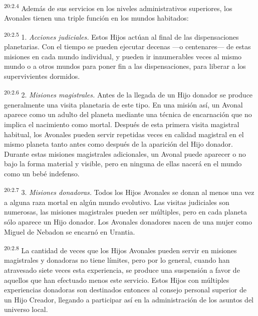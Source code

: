 \par
\textsuperscript{20:2.4} Además de sus servicios en los niveles administrativos superiores, los Avonales tienen una triple función en los mundos habitados:

\par
\textsuperscript{20:2.5} 1. \textit{Acciones judiciales.} Estos Hijos actúan al final de las dispensaciones planetarias. Con el tiempo se pueden ejecutar decenas ---o centenares--- de estas misiones en cada mundo individual, y pueden ir innumerables veces al mismo mundo o a otros mundos para poner fin a las dispensaciones, para liberar a los supervivientes dormidos.

\par
\textsuperscript{20:2.6} 2. \textit{Misiones magistrales.} Antes de la llegada de un Hijo donador se produce generalmente una visita planetaria de este tipo. En una misión así, un Avonal aparece como un adulto del planeta mediante una técnica de encarnación que no implica el nacimiento como mortal. Después de esta primera visita magistral habitual, los Avonales pueden servir repetidas veces en calidad magistral en el mismo planeta tanto antes como después de la aparición del Hijo donador. Durante estas misiones magistrales adicionales, un Avonal puede aparecer o no bajo la forma material y visible, pero en ninguna de ellas nacerá en el mundo como un bebé indefenso.

\par
\textsuperscript{20:2.7} 3. \textit{Misiones donadoras.} Todos los Hijos Avonales se donan al menos una vez a alguna raza mortal en algún mundo evolutivo. Las visitas judiciales son numerosas, las misiones magistrales pueden ser múltiples, pero en cada planeta sólo aparece un Hijo donador. Los Avonales donadores nacen de una mujer como Miguel de Nebadon se encarnó en Urantia.

\par
\textsuperscript{20:2.8} La cantidad de veces que los Hijos Avonales pueden servir en misiones magistrales y donadoras no tiene límites, pero por lo general, cuando han atravesado siete veces esta experiencia, se produce una suspensión a favor de aquellos que han efectuado menos este servicio. Estos Hijos con múltiples experiencias donadoras son destinados entonces al consejo personal superior de un Hijo Creador, llegando a participar así en la administración de los asuntos del universo local.

